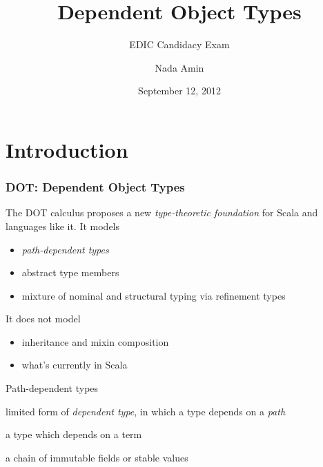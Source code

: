 \documentclass{beamer}
\title{Dependent Object Types}
\subtitle{EDIC Candidacy Exam}
\author{Nada Amin}
\institute{LAMP, I\&C, EPFL}
\date{September 12, 2012}
\begin{document}
\frame{\titlepage}

\section{Introduction}

\begin{frame}
\frametitle{DOT: Dependent Object Types}

The DOT calculus proposes a new \emph{type-theoretic foundation} for Scala
and languages like it. It models
\begin{itemize}
\item \emph{path-dependent types}
\item abstract type members
\item mixture of nominal and structural typing via refinement types
\end{itemize}

It does not model
\begin{itemize}
\item inheritance and mixin composition
\item what's currently in Scala
\end{itemize}

\end{frame}

\begin{frame}[fragile]{Path-dependent types}

\begin{description}
\item[path-dependent type] limited form of \emph{dependent type}, in which a type depends on a \emph{path}
\item[dependent type] a type which depends on a term
\item[path] a chain of immutable fields or stable values
\end{description}

\inputminted[frame=lines,fontsize=\footnotesize]{scala}{intro.scala}
\end{frame}
\end{document}
